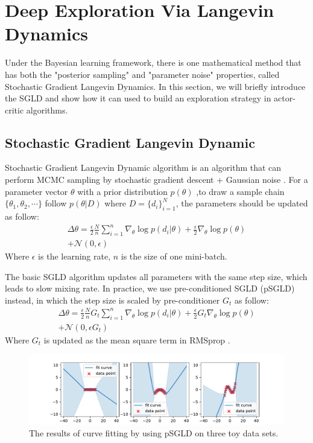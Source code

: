 \section{Deep Exploration Via Langevin Dynamics}
Under the Bayesian learning framework, there is one mathematical method that has both the "posterior sampling" and "parameter noise" properties, called Stochastic Gradient Langevin Dynamics. In this section, we will briefly introduce the SGLD and show how it can used to build an exploration strategy in actor-critic algorithms.

\subsection{Stochastic Gradient Langevin Dynamic}
Stochastic Gradient Langevin Dynamic algorithm is an algorithm that can perform MCMC sampling by stochastic gradient descent + Gaussian noise \cite{SGLD}. For a parameter vector $\theta$ with a prior distribution $p(\theta)$ ,to draw a sample chain $\{\theta_1,\theta_2,\cdots\}$ follow $p(\theta|D)$ where $D=\{d_i\}^N_{i=1}$, the parameters should be updated as follow:
\begin{equation}
   \label{eq:sgld} 
   \begin{aligned}
\Delta\theta =\frac{\epsilon}{2}\frac{N}{n}\sum_{i=1}^{n}\nabla_\theta\log p(d_i|\theta)+\frac{\epsilon}{2}\nabla_\theta\log p(\theta)\\
+\mathcal{N}(0,\epsilon)
\end{aligned}
\end{equation}
Where $\epsilon$ is the learning rate, $n$ is the size of one mini-batch. 

The basic SGLD algorithm updates all parameters with the same step size, which leads to slow mixing rate. In practice, we use pre-conditioned SGLD (pSGLD) instead, in which the step size is scaled by pre-conditioner $G_t$ as follow:
\begin{equation}
   \label{eq:psgld} 
   \begin{aligned}
      \Delta\theta =\frac{\epsilon}{2}\frac{N}{n}G_t\sum_{i=1}^{n}\nabla_\theta\log p(d_i|\theta)+\frac{\epsilon}{2}G_t\nabla_\theta\log p(\theta)\\
      +\mathcal{N}(0,\epsilon G_t)
   \end{aligned}
\end{equation}
Where $G_t$ is updated as the mean square term in RMSprop \cite{rmsprop}.
\begin{figure}[htbp]
   \begin{center}
      \centerline{\includegraphics[width=400pt]{figs/three-curve}}
   \caption{The results of curve fitting by using pSGLD on three toy data sets.}
   \label{fig:three}
   \end{center}
\end{figure}

